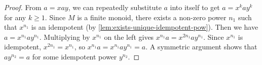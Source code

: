 \begin{proof}
\leanok
From $a = xay$, we can repeatedly substitute $a$ into itself to get $a = x^k a y^k$ for any $k \geq 1$. Since $M$ is a finite monoid, there exists a non-zero power $n_1$ such that $x^{n_1}$ is an idempotent (by \ref{lem:exists-unique-idempotent-pow}). Then we have $a = x^{n_1} a y^{n_1}$. Multiplying by $x^{n_1}$ on the left gives $x^{n_1}a = x^{2n_1} a y^{n_1}$. Since $x^{n_1}$ is idempotent, $x^{2n_1} = x^{n_1}$, so $x^{n_1}a = x^{n_1} a y^{n_1} = a$. A symmetric argument shows that $ay^{n_2} = a$ for some idempotent power $y^{n_2}$.
\end{proof}

